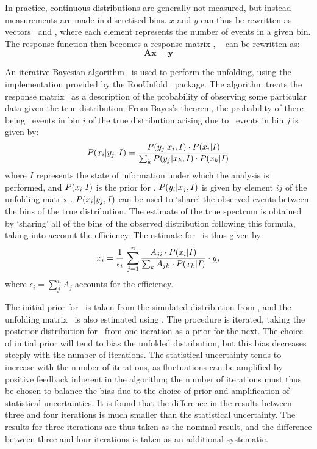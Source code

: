 In practice, continuous distributions are generally not measured, but instead
measurements are made
in discretised bins. $x$ and $y$ can thus be rewritten as
vectors \unfx\ and \unfy, where each element represents the number of events in
a given bin. The response
function then becomes a response matrix \unfA, ~ can be
rewritten as:
\begin{equation}
\mathbf{Ax} = \mathbf{y}
\label{eqn:unfold-conv-matrix}
\end{equation}

An iterative Bayesian algorithm~\cite{2010arXiv1010.0632D} is used to perform
the unfolding, 
using the implementation provided by the {\sc
RooUnfold}~\cite{2011arXiv1105.1160A} package. The algorithm treats the response
matrix \unfA\ as a description of the probability of observing some particular data given the
true distribution. From Bayes's theorem, the probability of there being 
\unfxi\ events in bin $i$ of the true distribution arising due to
\unfyj\ events in bin $j$ is given by:
\begin{equation}
P(x_i|y_j,I) = \frac{P(y_j|x_i,I)\cdot P(x_i|I)}{\sum_{k}P(y_j|x_k,I)\cdot P(x_k|I)}
\end{equation}
where $I$ represents the state of information under which the analysis is
performed, and $P(x_i|I)$ is the prior for \unfxi. $P(y_i|x_j,I)$ is
given by element $ij$ of the unfolding matrix \unfA. $P(x_i|y_j,I)$ can be used to `share' the observed events between the bins of the
true distribution. The estimate of the true spectrum is obtained by 
`sharing' all of the bins of the observed distribution following this formula, taking into
account the efficiency. The estimate for \unfxi\ is thus given by:
\begin{equation}
x_i = \frac{1}{\epsilon_{i}} \, \sum^{n}_{j=1} \frac{A_{ji} \cdot
P(x_i|I)}{\sum_k A_{jk} \cdot P(x_k|I)} \cdot y_j
\end{equation}
where $\epsilon_{i}=\sum^{n}_{j} A_{j}$ accounts for the efficiency.

The initial prior for \unfx\ is taken from the simulated distribution from
\mc, and the unfolding matrix \unfA\ is also estimated using \mcsim. The
procedure is iterated, taking the posterior distribution for \unfx\ from one iteration as a
prior for the next. The choice of initial prior will tend to bias the unfolded
distribution, but this bias decreases steeply with the number of iterations. The
statistical uncertainty tends to increase with the number of iterations, as
fluctuations can be amplified by positive feedback inherent in the algorithm;
the number of iterations must thus be chosen to balance the bias due to the
choice of prior and amplification of statistical uncertainties. It is found that
the difference in the results between three and four iterations is much smaller than
the statistical uncertainty. The results for three iterations are thus taken as
the nominal result, and the difference between three and four iterations is
taken as an additional systematic. 

